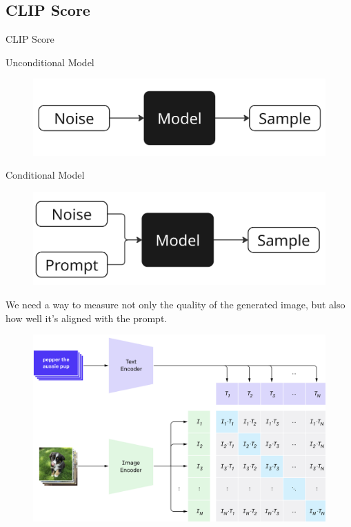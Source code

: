 \documentclass{beamer}
\begin{document}
\subsection{CLIP Score}
\begin{frame}{CLIP Score}
	\vspace{-0.5cm}
	\begin{minipage}{0.5\linewidth}
		\begin{block}{Unconditional Model}
			\begin{figure}
				\includegraphics[width=0.95\linewidth]{figs/uncond_model}
			\end{figure}
		\end{block}
		\vspace{0.2cm}
	\end{minipage}%
	\begin{minipage}{0.5\linewidth}
		\begin{block}{Conditional Model}
			\begin{figure}
				\includegraphics[width=0.95\linewidth]{figs/cond_model}
			\end{figure}
		\end{block}
	\end{minipage}

	\eqpause
	We need a way to measure not only the quality of the generated image, but also how well it's aligned with the prompt.
	\eqpause
	\begin{figure}
		\includegraphics[width=0.6\linewidth]{figs/clip}
	\end{figure}
\end{frame}
\end{document}

